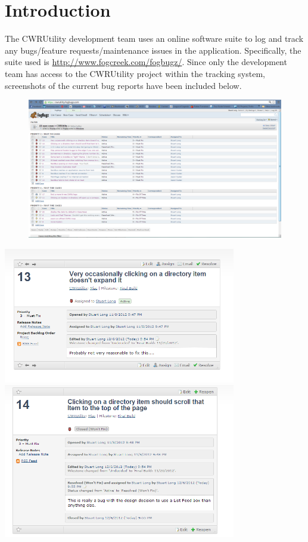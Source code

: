 \documentclass[pdftex,12pt,letter]{article}
\begin{document}
\section{Introduction}
The CWRUtility development team uses an online software suite to log and track any bugs/feature requests/maintenance issues in the application. Specifically, the suite used is 
\url{http://www.fogcreek.com/fogbugz/}. Since only the development team has access to the CWRUtility project within the tracking system, screenshots of the current bug reports have been included below. 
\newpage
\begin{figure}
\includegraphics[width=9in]{bugs1.png}
\end{figure}
\FloatBarrier
\includegraphics[width=4in]{bugs2.png}
\FloatBarrier
\includegraphics[width=4in]{bugs3.png}
\end{document}
